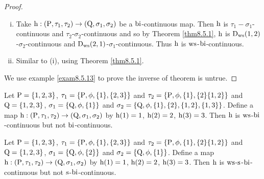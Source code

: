 \begin{proof}
\begin{enumerate}[(i)]
\item Take $\mathrm{h}:(\mathrm{P}, \tau_1, \tau_2 )\to (\mathrm{Q}, \sigma_{1}, \sigma_{2} )$ be a $\mathrm{bi}$-continuous map. Then $\mathrm{h}$ is $\tau_1 -\sigma_{1}$-continuous and $\tau_2$-$\sigma_{2}$-continuous and so by Theorem \ref{thm8.5.1}, $\mathrm{h}$ is $\mathrm{D}_{\mathrm{ws}} (1, 2)$-$\sigma_{2}$-continuous and $\mathrm{D}_{\mathrm{ws}} (2, 1)$-$\sigma_{1}$-continuous. Thus $\mathrm{h}$ is $\mathrm{ws}$-$\mathrm{bi}$-continuous.

\item Similar to (i), using Theorem \ref{thm8.5.1}.
\end{enumerate}

We use example \ref{exam8.5.13} to prove the inverse of theorem is untrue.
\end{proof}

\begin{exm}\label{exam8.5.13}
Let $\mathrm{P}=\{1,2,3\}$, $\tau_1 =\{\mathrm{P}, \phi, \{1\},\{2,3\}\}$ and $\tau_2 =\{\TSP, \phi,\{1\},\{2\}\break \{1,2\}\}$ and $\mathrm{Q}=\{1,2,3\}$, $\sigma_{1} =\{\mathrm{Q}, \phi, \{1\}\}$ and $\sigma_{2} =\{\mathrm{Q}, \phi, \{1\},\{2\},\{1,2\},\{1,3\}\}$. Define a map $\mathrm{h}: (\mathrm{P}, \tau_1, \tau_2 )\to (\mathrm{Q}, \sigma_{1}, \sigma_{2} )$ by $\mathrm{h}(1)=1$, $\mathrm{h}(2)=2$, $\mathrm{h}(3)=3$. Then $\mathrm{h}$ is $\mathrm{ws}$-$\mathrm{bi}$-continuous but not $\mathrm{bi}$-continuous.
\end{exm}

\begin{exm}\label{exam8.5.14}
Let $\mathrm{P}=\{1,2,3\}$, $\tau_1 =\{\mathrm{P}, \phi, \{1\},\{2,3\}\}$ and $\tau_2 =\{\TSP, \phi,\{1\},\{2\}\break \{1,2\}\}$ and $\mathrm{Q}=\{1,2,3\}$, $\sigma_{1} =\{\mathrm{Q}, \phi, \{2\}\}$ and $\sigma_{2} =\{\mathrm{Q}, \phi, \{1\}\}$. Define a map $\mathrm{h}: (\mathrm{P}, \tau_1, \tau_2)\to (\mathrm{Q}, \sigma_{1}, \sigma_{2} )$ by $\mathrm{h}(1)=1$, $\mathrm{h}(2)=2$, $\mathrm{h}(3)=3$. Then $\mathrm{h}$ is $\mathrm{ws}$-$\mathrm{s}$-$\mathrm{bi}$-continuous but not $\mathrm{s}$-$\mathrm{bi}$-continuous.
\end{exm}
